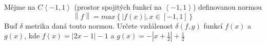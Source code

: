Mějme na $C\left \langle -1,1 \right \rangle$ (prostor spojitých funkcí na
$\left \langle -1,1 \right \rangle$) definovanou normou $$\left \| f \right
\|=max\left \{ \left | f(x) \right |,x \in \left [ -1,1 \right ] \right \}$$
Buď $\delta$ metrika daná touto normou. Určete vzdálenost $\delta(f,g)$ funkcí
$f(x)$ a $g(x)$, kde $f(x)=\left | 2x-1 \right |-1$ a $g(x)=-\left |
x+\frac{1}{2} \right |+\frac{1}{2}$
